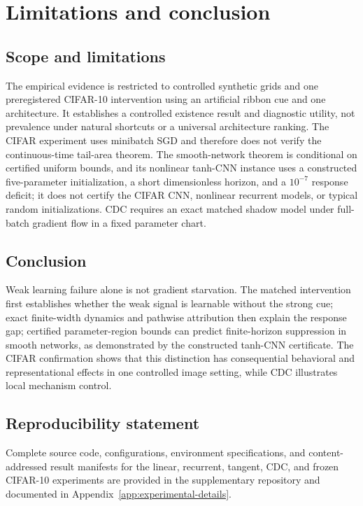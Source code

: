 \documentclass{article}
\theoremstyle{definition}
\theoremstyle{remark}
\begin{document}
\section{Limitations and conclusion}
\subsection{Scope and limitations}
The empirical evidence is restricted to controlled synthetic grids and one preregistered CIFAR-10 intervention using an artificial ribbon cue and one architecture. It establishes a controlled existence result and diagnostic utility, not prevalence under natural shortcuts or a universal architecture ranking. The CIFAR experiment uses minibatch SGD and therefore does not verify the continuous-time tail-area theorem. The smooth-network theorem is conditional on certified uniform bounds, and its nonlinear tanh-CNN instance uses a constructed five-parameter initialization, a short dimensionless horizon, and a $10^{-7}$ response deficit; it does not certify the CIFAR CNN, nonlinear recurrent models, or typical random initializations. CDC requires an exact matched shadow model under full-batch gradient flow in a fixed parameter chart.

\subsection{Conclusion}
Weak learning failure alone is not gradient starvation. The matched intervention first establishes whether the weak signal is learnable without the strong cue; exact finite-width dynamics and pathwise attribution then explain the response gap; certified parameter-region bounds can predict finite-horizon suppression in smooth networks, as demonstrated by the constructed tanh-CNN certificate. The CIFAR confirmation shows that this distinction has consequential behavioral and representational effects in one controlled image setting, while CDC illustrates local mechanism control.

\subsection*{Reproducibility statement}
Complete source code, configurations, environment specifications, and content-addressed result manifests for the linear, recurrent, tangent, CDC, and frozen CIFAR-10 experiments are provided in the supplementary repository and documented in Appendix~\ref{app:experimental-details}.
\end{document}
